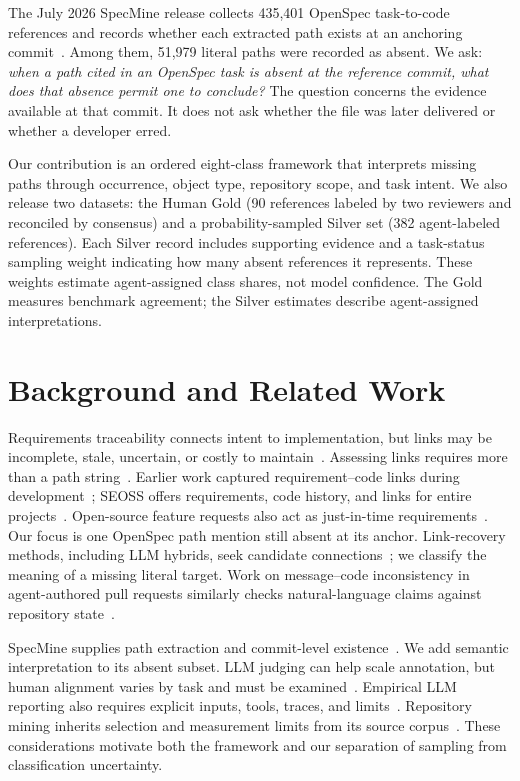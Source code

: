 \documentclass[10pt,conference]{IEEEtran}
\begin{document}
The July 2026 SpecMine release collects 435,401 OpenSpec task-to-code references and records whether each extracted path exists at an anchoring commit~\cite{specmine2027}. Among them, 51,979 literal paths were recorded as absent. We ask: \emph{when a path cited in an OpenSpec task is absent at the reference commit, what does that absence permit one to conclude?} The question concerns the evidence available at that commit. It does not ask whether the file was later delivered or whether a developer erred.

Our contribution is an ordered eight-class framework that interprets missing paths through occurrence, object type, repository scope, and task intent. We also release two datasets: the Human Gold (90 references labeled by two reviewers and reconciled by consensus) and a probability-sampled Silver set (382 agent-labeled references). Each Silver record includes supporting evidence and a task-status sampling weight indicating how many absent references it represents. These weights estimate agent-assigned class shares, not model confidence. The Gold measures benchmark agreement; the Silver estimates describe agent-assigned interpretations.

\section{Background and Related Work}
Requirements traceability connects intent to implementation, but links may be incomplete, stale, uncertain, or costly to maintain~\cite{gotel1994,ramesh2001,ruiz2023,charalampidou2021,ghabi2015,mader2012}. Assessing links requires more than a path string~\cite{sundaram2010}. Earlier work captured requirement--code links during development~\cite{delater2013}; SEOSS offers requirements, code history, and links for entire projects~\cite{rath2019}. Open-source feature requests also act as just-in-time requirements~\cite{heck2014}. Our focus is one OpenSpec path mention still absent at its anchor. Link-recovery methods, including LLM hybrids, seek candidate connections~\cite{nagata2026}; we classify the meaning of a missing literal target. Work on message--code inconsistency in agent-authored pull requests similarly checks natural-language claims against repository state~\cite{gong2026}.

SpecMine supplies path extraction and commit-level existence~\cite{specmine2027}. We add semantic interpretation to its absent subset. LLM judging can help scale annotation, but human alignment varies by task and must be examined~\cite{ahmed2025,wang2025}. Empirical LLM reporting also requires explicit inputs, tools, traces, and limits~\cite{baltes2026}. Repository mining inherits selection and measurement limits from its source corpus~\cite{kalliamvakou2014}. These considerations motivate both the framework and our separation of sampling from classification uncertainty.
\end{document}
